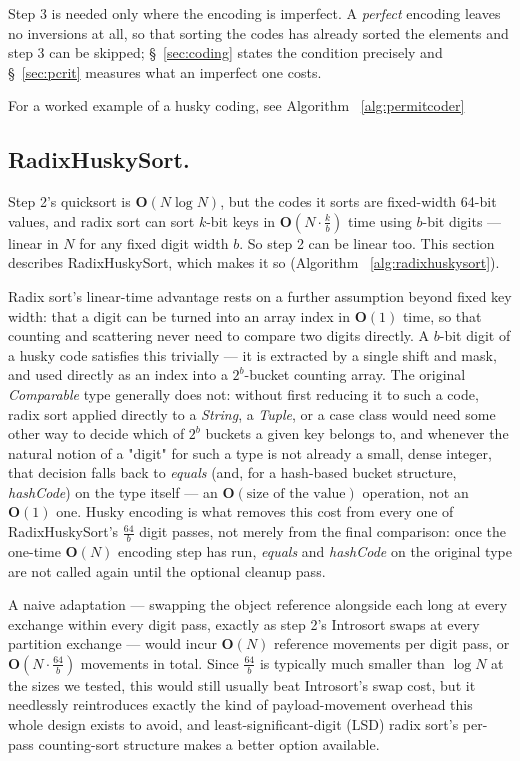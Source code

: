 \documentclass[twoside,leqno,twocolumn]{article}
\begin{document}
Step 3 is needed only where the encoding is imperfect.
A \textit{perfect} encoding leaves no inversions at all, so that sorting the codes has already
sorted the elements and step 3 can be skipped;
\S~\ref{sec:coding} states the condition precisely and \S~\ref{sec:pcrit} measures what an
imperfect one costs.

For a worked example of a husky coding, see Algorithm ~\ref{alg:permitcoder}

\subsection{RadixHuskySort.}
\label{sec:radix}

Step 2's quicksort is $\textbf{O}(N \log N)$, but the codes it sorts are fixed-width 64-bit values,
and radix sort can sort $k$-bit keys in $\textbf{O}(N \cdot \frac{k}{b})$ time using $b$-bit digits ---
linear in $N$ for any fixed digit width $b$.
So step 2 can be linear too.
This section describes RadixHuskySort, which makes it so (Algorithm ~\ref{alg:radixhuskysort}).

Radix sort's linear-time advantage rests on a further assumption beyond fixed key width:
that a digit can be turned into an array index in $\textbf{O}(1)$ time,
so that counting and scattering never need to compare two digits directly.
A $b$-bit digit of a husky code satisfies this trivially —
it is extracted by a single shift and mask, and used directly as an index into a $2^b$-bucket counting array.
The original \textit{Comparable} type generally does not:
without first reducing it to such a code, radix sort applied directly to a \textit{String},
a \textit{Tuple}, or a case class would need some other way to decide which of $2^b$ buckets a given key belongs to,
and whenever the natural notion of a "digit" for such a type is not already a small, dense integer,
that decision falls back to \textit{equals} (and, for a hash-based bucket structure,
\textit{hashCode}) on the type itself — an $\textbf{O}(\text{size of the value})$ operation, not an $\textbf{O}(1)$ one.
Husky encoding is what removes this cost from every one of RadixHuskySort's $\frac{64}{b}$ digit passes,
not merely from the final comparison:
once the one-time $\textbf{O}(N)$ encoding step has run,
\textit{equals} and \textit{hashCode} on the original type are not called again until the optional cleanup pass.

A naive adaptation — swapping the object reference alongside each long at every exchange within every digit pass,
exactly as step 2's Introsort swaps at every partition exchange —
would incur $\textbf{O}(N)$ reference movements per digit pass, or $\textbf{O}(N \cdot \frac{64}{b})$ movements in total.
Since $\frac{64}{b}$ is typically much smaller than $\log N$ at the sizes we tested,
this would still usually beat Introsort's swap cost,
but it needlessly reintroduces exactly the kind of payload-movement overhead this whole design exists to avoid,
and least-significant-digit (LSD) radix sort's per-pass counting-sort structure makes a better option available.
\end{document}
